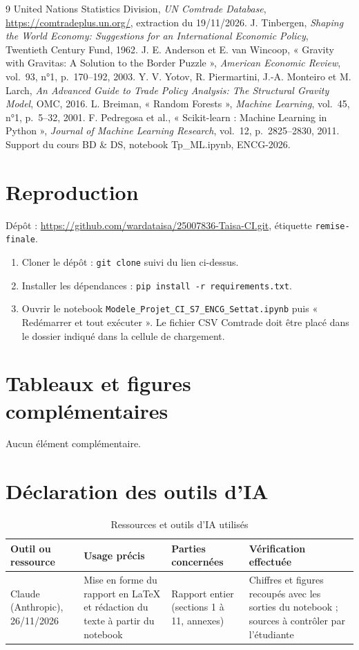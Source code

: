 \documentclass[11pt,a4paper]{article}
\begin{document}
\begin{thebibliography}{9}
 United Nations Statistics Division, \emph{UN Comtrade Database}, \url{https://comtradeplus.un.org/}, extraction du 19/11/2026.
 J. Tinbergen, \emph{Shaping the World Economy: Suggestions for an International Economic Policy}, Twentieth Century Fund, 1962.
 J. E. Anderson et E. van Wincoop, « Gravity with Gravitas: A Solution to the Border Puzzle », \emph{American Economic Review}, vol.~93, n°1, p.~170--192, 2003.
 Y. V. Yotov, R. Piermartini, J.-A. Monteiro et M. Larch, \emph{An Advanced Guide to Trade Policy Analysis: The Structural Gravity Model}, OMC, 2016.
 L. Breiman, « Random Forests », \emph{Machine Learning}, vol.~45, n°1, p.~5--32, 2001.
 F. Pedregosa et al., « Scikit-learn : Machine Learning in Python », \emph{Journal of Machine Learning Research}, vol.~12, p.~2825--2830, 2011.
 Support du cours BD \& DS, notebook Tp\_ML.ipynb, ENCG-2026.
\end{thebibliography}

\appendix
\section{Reproduction}
Dépôt : \url{https://github.com/wardataisa/25007836-Taisa-CI.git}, étiquette \texttt{remise-finale}.
\begin{enumerate}[leftmargin=1.5em]
\item Cloner le dépôt : \texttt{git clone} suivi du lien ci-dessus.
\item Installer les dépendances : \texttt{pip install -r requirements.txt}.
\item Ouvrir le notebook \texttt{Modele\_Projet\_CI\_S7\_ENCG\_Settat.ipynb} puis « Redémarrer et tout exécuter ». Le fichier CSV Comtrade doit être placé dans le dossier indiqué dans la cellule de chargement.
\end{enumerate}

\section{Tableaux et figures complémentaires}
Aucun élément complémentaire.

\section{Déclaration des outils d'IA}
\begin{table}[H]\centering\small
\caption{Ressources et outils d'IA utilisés}
\begin{tabularx}{\textwidth}{@{}XXXX@{}}
\toprule
Outil ou ressource & Usage précis & Parties concernées & Vérification effectuée\\\midrule
Claude (Anthropic), 26/11/2026 & Mise en forme du rapport en LaTeX et rédaction du texte à partir du notebook & Rapport entier (sections 1 à 11, annexes) & Chiffres et figures recoupés avec les sorties du notebook ; sources à contrôler par l'étudiante\\
\bottomrule
\end{tabularx}
\end{table}
\end{document}
